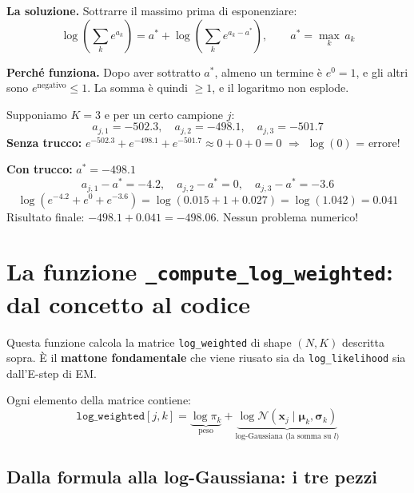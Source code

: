 \documentclass[11pt,a4paper]{article}
\begin{document}
\textbf{La soluzione.} Sottrarre il massimo prima di esponenziare:
\begin{equation}
    \boxed{\log\!\left(\sum_k e^{a_k}\right) = a^* + \log\!\left(\sum_k e^{a_k - a^*}\right), \qquad a^* = \max_k\, a_k}
    \label{eq:logsumexp}
\end{equation}

\textbf{Perch\'e funziona.} Dopo aver sottratto $a^*$, almeno un termine \`e $e^0 = 1$, e gli altri sono $e^{\text{negativo}} \leq 1$. La somma \`e quindi $\geq 1$, e il logaritmo non esplode.

\begin{exbox}
Supponiamo $K = 3$ e per un certo campione $j$:
$$a_{j,1} = -502.3, \quad a_{j,2} = -498.1, \quad a_{j,3} = -501.7$$
\textbf{Senza trucco:} $e^{-502.3} + e^{-498.1} + e^{-501.7} \approx 0 + 0 + 0 = 0$ $\Rightarrow$ $\log(0)$ = errore!

\textbf{Con trucco:} $a^* = -498.1$
$$a_{j,1} - a^* = -4.2, \quad a_{j,2} - a^* = 0, \quad a_{j,3} - a^* = -3.6$$
$$\log\!\left(e^{-4.2} + e^{0} + e^{-3.6}\right) = \log(0.015 + 1 + 0.027) = \log(1.042) = 0.041$$
Risultato finale: $-498.1 + 0.041 = -498.06$. Nessun problema numerico!
\end{exbox}

\section{La funzione \texttt{\_compute\_log\_weighted}: dal concetto al codice}

Questa funzione calcola la matrice \texttt{log\_weighted} di shape $(N, K)$ descritta sopra. \`E il \textbf{mattone fondamentale} che viene riusato sia da \texttt{log\_likelihood} sia dall'E-step di EM.

\medskip
Ogni elemento della matrice contiene:
$$\texttt{log\_weighted}[j, k] = \underbrace{\log\pi_k}_{\text{peso}} + \underbrace{\log\mathcal{N}(\mathbf{x}_j\mid\boldsymbol{\mu}_k, \boldsymbol{\sigma}_k)}_{\text{log-Gaussiana (la somma su $l$)}}$$

\subsection{Dalla formula alla log-Gaussiana: i tre pezzi}
\end{document}
